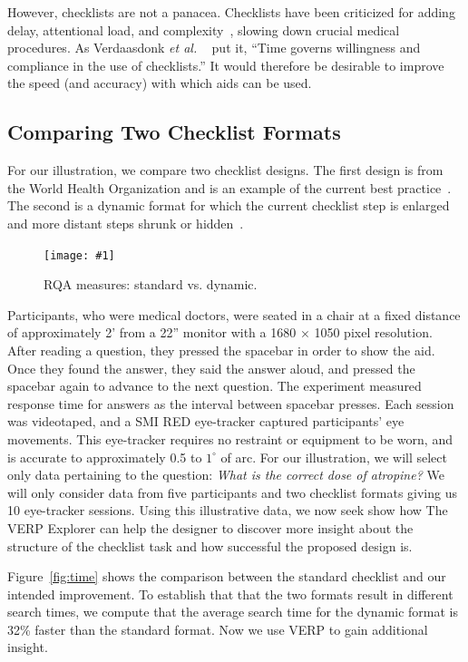 \documentclass[journal]{vgtc}                %
\newcommand{\insertpicture}[2]{\begin{center}\texttt{[image: \#1]}\end{center}}
\newcommand{\etal}{\textit{et al.}\xspace}
\DeclareRobustCommand{\deg}{^{\circ}\xspace}
\begin{document}
However, checklists are not a panacea. Checklists have been criticized for adding
delay, attentional load, and complexity~\cite{Gawande_2009,Winters_2009}, 
slowing down crucial medical procedures. As Verdaasdonk \etal
~\cite{Verdaasdonk_2008}  put it, “Time governs
willingness and compliance in the use of checklists.” 
It would therefore be desirable to improve the speed (and accuracy) 
with which aids can be used.

\subsection{Comparing Two Checklist Formats} 
For our illustration, we compare two  checklist designs. The first 
design is from the  World Health Organization and is an example 
of the current best practice~\cite{James_2013}.  The second is a dynamic 
format for which  the current checklist step is enlarged and more distant 
steps shrunk  or hidden~\cite{Cirimele_2014}.

\begin{figure}
\insertpicture{figures/rqaComparison.pdf}{0.5}
\caption{RQA measures: standard vs. dynamic.\label{fig:rqacomparison}} 
\end{figure}


Participants, who were medical doctors, were seated in a chair at a fixed
distance of approximately 2' from a 22'' monitor with a 1680 × 1050 pixel
resolution. After reading a question, they pressed the spacebar in order to
show the aid. Once they found the answer, they said the answer aloud, and
pressed the spacebar again to advance to the next question. The experiment
measured response time for answers as the interval between spacebar
presses. Each session was videotaped, and a SMI RED eye-tracker captured
participants’ eye movements. This eye-tracker requires no restraint or
equipment to be worn, and is accurate to approximately 0.5 to $1\deg$ of arc.
For our illustration, we will select only data pertaining to the question:
\emph{What is the correct dose of atropine?} We will only consider data from
five participants and two checklist formats giving us 10 eye-tracker
sessions. Using this illustrative data, we now seek show how The VERP Explorer 
can help the designer to discover more insight about the structure of the checklist 
task and how successful the proposed design is. 

Figure~\ref{fig:time} shows the comparison between the standard
checklist and our intended improvement. To establish that that the two formats result 
in different search times, we compute that the average search time for the dynamic format
is 32\% faster than the standard format. Now we use VERP to gain additional insight.  
\end{document}
